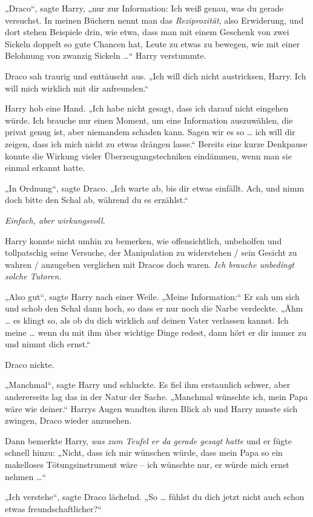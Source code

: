 {„Draco“, sagte Harry, „nur zur Information: Ich weiß genau, was du gerade versuchst. In meinen Büchern nennt man das \emph{Reziprozität}, also Erwiderung, und dort stehen Beispiele drin, wie etwa, dass man mit einem Geschenk von zwei Sickeln doppelt so gute Chancen hat, Leute zu etwas zu bewegen, wie mit einer Belohnung von zwanzig Sickeln …“ Harry verstummte.

Draco sah traurig und enttäuscht aus. „Ich will dich nicht austricksen, Harry. Ich will mich wirklich mit dir anfreunden.“

Harry hob eine Hand. „Ich habe nicht gesagt, dass ich darauf nicht eingehen würde. Ich brauche nur einen Moment, um eine Information auszuwählen, die privat genug ist, aber niemandem schaden kann. Sagen wir es so … ich will dir zeigen, dass ich mich nicht zu etwas drängen lasse.“ Bereits eine kurze Denkpause konnte die Wirkung vieler Überzeugungstechniken eindämmen, wenn man sie einmal erkannt hatte.

„In Ordnung“, sagte Draco. „Ich warte ab, bis dir etwas einfällt. Ach, und nimm doch bitte den Schal ab, während du es erzählst.“

\emph{Einfach, aber wirkungsvoll.}

Harry konnte nicht umhin zu bemerken, wie offensichtlich, unbeholfen und tollpatschig seine Versuche, der Manipulation zu widerstehen / sein Gesicht zu wahren / anzugeben verglichen mit Dracos doch waren. \emph{Ich brauche unbedingt solche Tutoren.}

„Also gut“, sagte Harry nach einer Weile. „Meine Information:“ Er sah um sich und schob den Schal dann hoch, so dass er nur noch die Narbe verdeckte. „Ähm … es klingt so, als ob du dich wirklich auf deinen Vater verlassen kannst. Ich meine … wenn du mit ihm über wichtige Dinge redest, dann hört er dir immer zu und nimmt dich ernst.“

Draco nickte.

„Manchmal“, sagte Harry und schluckte. Es fiel ihm erstaunlich schwer, aber andererseits lag das in der Natur der Sache. „Manchmal wünschte ich, mein Papa wäre wie deiner.“ Harrys Augen wandten ihren Blick ab und Harry musste sich zwingen, Draco wieder anzusehen.

Dann bemerkte Harry, \emph{was zum Teufel er da gerade gesagt hatte} und er fügte schnell hinzu: „Nicht, dass ich mir wünschen würde, dass mein Papa so ein makelloses Tötungsinstrument wäre -- ich wünschte nur, er würde mich ernst nehmen …“

„Ich verstehe“, sagte Draco lächelnd. „So … fühlst du dich jetzt nicht auch schon etwas freundschaftlicher?“

}
